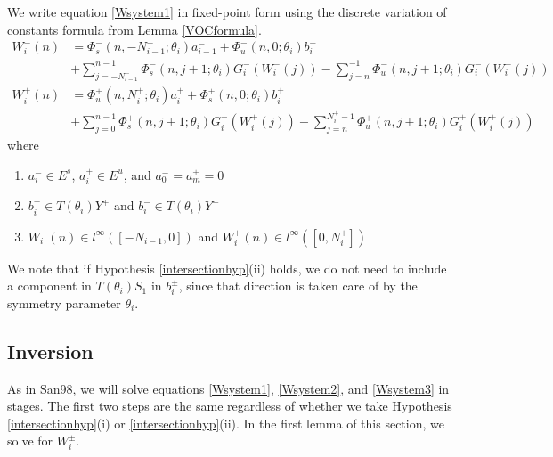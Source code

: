\documentclass[12pt]{article}
\begin{document}
We write equation \eqref{Wsystem1} in fixed-point form using the discrete variation of constants formula from Lemma \ref{VOCformula}.
\begin{equation}\label{FPeqs1}
\begin{aligned}
W_i^-(n) &= 
\Phi_s^-(n, -N_{i-1}^-; \theta_i) a_{i-1}^- + \Phi_u^-(n, 0; \theta_i) b_i^-  \\
&+ \sum_{j = -N_{i-1}^-}^{n-1} \Phi_s^-(n, j+1; \theta_i) G_i^-(W_i^-(j)) - \sum_{j = n}^{-1} \Phi_u^-(n, j+1; \theta_i) G_i^-(W_i^-(j)) \\
W_i^+(n) &= \Phi_u^+(n, N_i^+; \theta_i) a_i^+ + \Phi_s^+(n, 0; \theta_i) b_i^+ \\
&+ \sum_{j = 0}^{n-1} \Phi_s^+(n, j+1; \theta_i) G_i^+(W_i^+(j)) 
- \sum_{j = n}^{N_i^+-1} \Phi_u^+(n, j+1; \theta_i) G_i^+(W_i^+(j))
\end{aligned}
\end{equation}
where 
\begin{enumerate}
\item $a_i^- \in E^s$, $a_i^+ \in E^u$, and $a_0^- = a_m^+ = 0$
\item $b_i^+ \in T(\theta_i) Y^+$ and $b_i^- \in T(\theta_i) Y^-$
\item $W_i^-(n) \in l^\infty([-N_{i-1}^-, 0])$ and $W_i^+(n) \in l^\infty([0, N_i^+])$
\end{enumerate}

We note that if Hypothesis \ref{intersectionhyp}(ii) holds, we do not need to include a component in $T(\theta_i) S_1$ in $b_i^\pm$, since that direction is taken care of by the symmetry parameter $\theta_i$.

\subsection{Inversion}

As in San98, we will solve equations \eqref{Wsystem1}, \eqref{Wsystem2}, and \eqref{Wsystem3} in stages. The first two steps are the same regardless of whether we take Hypothesis \ref{intersectionhyp}(i) or \ref{intersectionhyp}(ii). In the first lemma of this section, we solve for $W_i^\pm$.
\end{document}
